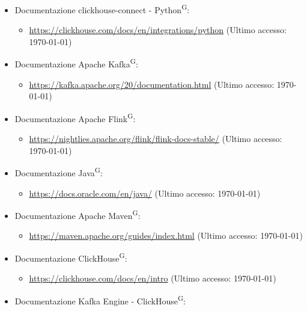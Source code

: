 \documentclass[8pt]{article}
\newcommand{\glossterm}[1]{#1\textsuperscript{G}} %
\begin{document}
\begin{itemize}
\begin{itemize}
		\item \href{https://developer.confluent.io/get-started/python/}{\color{myblue}https://developer.confluent.io/get-started/python/} (Ultimo accesso: \today)
	\end{itemize}
    \item Documentazione clickhouse-connect - \glossterm{Python}:
    \begin{itemize}
		\item \href{https://clickhouse.com/docs/en/integrations/python}{\color{myblue}https://clickhouse.com/docs/en/integrations/python} (Ultimo accesso: \today)
	\end{itemize}
    \item Documentazione Apache \glossterm{Kafka}:
    \begin{itemize}
		\item \href{https://kafka.apache.org/20/documentation.html}{\color{myblue}https://kafka.apache.org/20/documentation.html} (Ultimo accesso: \today)
	\end{itemize}
    \item Documentazione Apache \glossterm{Flink}:
    \begin{itemize}
		\item \href{https://nightlies.apache.org/flink/flink-docs-stable/}{\color{myblue}https://nightlies.apache.org/flink/flink-docs-stable/} (Ultimo accesso: \today)
	\end{itemize}
    \item Documentazione \glossterm{Java}:
    \begin{itemize}
		\item \href{https://docs.oracle.com/en/java/}{\color{myblue}https://docs.oracle.com/en/java/} (Ultimo accesso: \today)
	\end{itemize}
    \item Documentazione Apache \glossterm{Maven}:
    \begin{itemize}
		\item \href{https://maven.apache.org/guides/index.html}{\color{myblue}https://maven.apache.org/guides/index.html} (Ultimo accesso: \today)
	\end{itemize}
    \item Documentazione \glossterm{ClickHouse}:
    \begin{itemize}
		\item \href{https://clickhouse.com/docs/en/intro}{\color{myblue}https://clickhouse.com/docs/en/intro} (Ultimo accesso: \today)
	\end{itemize}
    \item Documentazione Kafka Engine - \glossterm{ClickHouse}:

\end{itemize}
\end{document}
